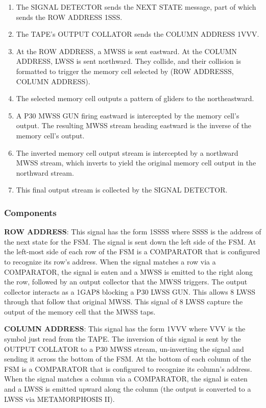 \documentclass{article}
\begin{document}
\begin{enumerate}
\item The SIGNAL DETECTOR sends the NEXT STATE message, part of which sends the ROW ADDRESS 1SSS.


\item The TAPE's OUTPUT COLLATOR sends the COLUMN ADDRESS 1VVV.


\item At the ROW ADDRESS, a MWSS is sent eastward. At the COLUMN ADDRESS, LWSS is sent northward. They collide, and their collision is formatted to trigger the memory cell selected by (ROW ADDRESSS, COLUMN ADDRESS).


\item The selected memory cell outputs a pattern of gliders to the northeastward.


\item A P30 MWSS GUN firing eastward is intercepted by the memory cell's output. The resulting MWSS stream heading eastward is the inverse of the memory cell's output.


\item The inverted memory cell output stream is intercepted by a northward MWSS stream, which inverts to yield the original memory cell output in the northward stream.


\item This final output stream is collected by the SIGNAL DETECTOR.

\end{enumerate}

\subsubsection{Components}
\noindent\textbf{ROW ADDRESS}: This signal has the form 1SSSS where SSSS is the address of the next state for the FSM. The signal is sent down the left side of the FSM. At the left-most side of each row of the FSM is a COMPARATOR that is configured to recognize its row's address. When the signal matches a row via a COMPARATOR, the signal is eaten and a MWSS is emitted to the right along the row, followed by an output collector that the MWSS triggers. The output collector interacts as a 1GAP8 blocking a P30 LWSS GUN. This allows 8 LWSS through that follow that original MWSS. This signal of 8 LWSS capture the output of the memory cell that the MWSS taps.

\vspace{1em}

\noindent\textbf{COLUMN ADDRESS}: This signal has the form 1VVV where VVV is the symbol just read from the TAPE. The inversion of this signal is sent by the OUTPUT COLLATOR to a P30 MWSS stream, un-inverting the signal and sending it across the bottom of the FSM. At the bottom of each column of the FSM is a COMPARATOR that is configured to recognize its column's address. When the signal matches a column via a COMPARATOR, the signal is eaten and a LWSS is emitted upward along the column (the output is converted to a LWSS via METAMORPHOSIS II).
\end{document}
